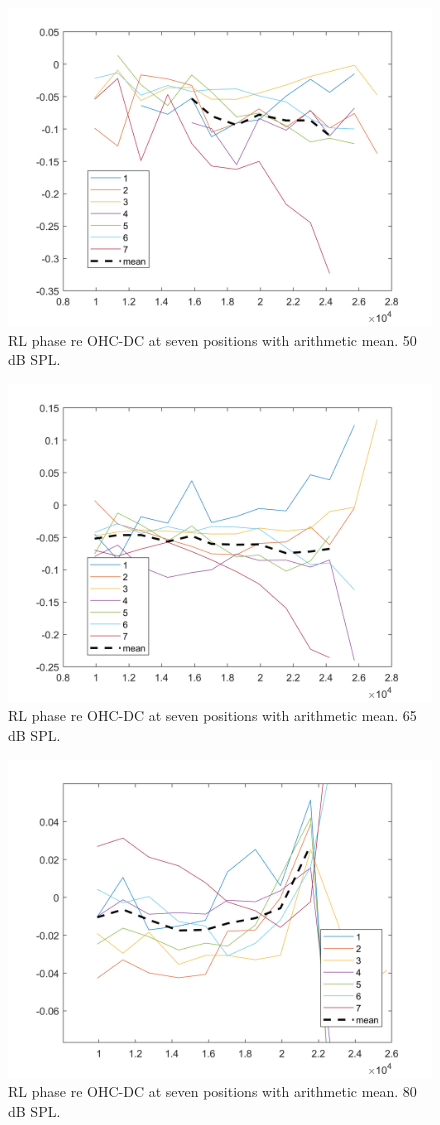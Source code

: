 \documentclass{article}
\begin{document}
\begin{figure}
	\centering
	\includegraphics[width=.7\textwidth]{Figures/rlredc50.png}
	\caption{RL phase re OHC-DC at seven positions with arithmetic mean. 50 dB SPL.}
	\label{rlredc50}
\end{figure}

\begin{figure}
	\centering
	\includegraphics[width=.7\textwidth]{Figures/rlredc65.png}
	\caption{RL phase re OHC-DC at seven positions with arithmetic mean. 65 dB SPL.}
	\label{rlredc65}
\end{figure}

\begin{figure}
	\centering
	\includegraphics[width=.7\textwidth]{Figures/rlredc80.png}
	\caption{RL phase re OHC-DC at seven positions with arithmetic mean. 80 dB SPL.}
	\label{rlredc80}
\end{figure}
\end{document}
